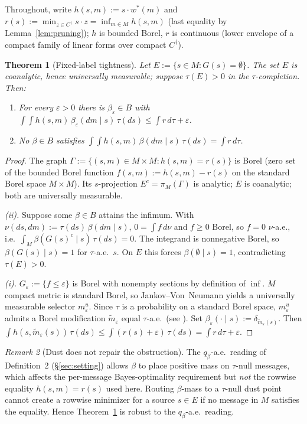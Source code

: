 \documentclass[11pt]{article}
\newtheorem{theorem}{Theorem}
\theoremstyle{definition}
\theoremstyle{remark}
\newtheorem{remark}[theorem]{Remark}
\newcommand{\eps}{\varepsilon}
\begin{document}
Throughout, write $h(s,m) := s\cdot w^*(m)$ and
$r(s) := \min_{z\in C^\dagger} s\cdot z = \inf_{m\in M} h(s,m)$ (last
equality by Lemma~\ref{lem:pruning}); $h$ is bounded Borel, $r$ is
continuous (lower envelope of a compact family of linear forms over
compact $C^\dagger$).

\begin{theorem}[Fixed-label tightness]\label{thm:tightness}
Let $E := \{s\in M : G(s) = \emptyset\}$. The set $E$ is coanalytic,
hence universally measurable; suppose $\tau(E)>0$ in the
$\tau$-completion. Then:
\begin{enumerate}[leftmargin=2em,label=(\roman*)]
\item For every $\eps>0$ there is $\beta_\eps\in B$ with
$\int\!\int h(s,m)\,\beta_\eps(dm\mid s)\,\tau(ds) \le \int r\,d\tau + \eps$.
\item No $\beta\in B$ satisfies
$\int\!\int h(s,m)\,\beta(dm\mid s)\,\tau(ds) = \int r\,d\tau$.
\end{enumerate}
\end{theorem}

\begin{proof}
The graph
$\Gamma := \{(s,m)\in M\times M : h(s,m) = r(s)\}$ is Borel (zero
set of the bounded Borel function $f(s,m) := h(s,m) - r(s)$ on the
standard Borel space $M\times M$). Its $s$-projection
$E^c = \pi_M(\Gamma)$ is analytic; $E$ is coanalytic; both are
universally measurable.

\emph{(ii).} Suppose some $\beta\in B$ attains the infimum. With
$\nu(ds,dm) := \tau(ds)\,\beta(dm\mid s)$,
$0 = \int f\,d\nu$ and $f\ge 0$ Borel, so $f = 0$ $\nu$-a.e., i.e.\
$\int_M \beta(G(s)^c\mid s)\,\tau(ds) = 0$. The integrand is
nonnegative Borel, so $\beta(G(s)\mid s) = 1$ for $\tau$-a.e.\ $s$.
On $E$ this forces $\beta(\emptyset\mid s) = 1$, contradicting
$\tau(E) > 0$.

\emph{(i).} $G_\eps := \{f\le\eps\}$ is Borel with nonempty
sections by definition of $\inf$. $M$ compact metric is standard
Borel, so Jankov--Von~Neumann
\cite[Thm.~18.13]{AliprantisBorder2006} yields a universally
measurable selector $m_\eps^u$. Since $\tau$ is a probability on a
standard Borel space, $m_\eps^u$ admits a Borel modification
$\tilde m_\eps$ equal $\tau$-a.e.\ (see \cite{Bogachev2007}). Set
$\beta_\eps(\cdot\mid s) := \delta_{\tilde m_\eps(s)}$.
Then $\int h(s,\tilde m_\eps(s))\,\tau(ds)\le \int(r(s)+\eps)\,\tau(ds)
= \int r\,d\tau + \eps$.
\end{proof}

\begin{remark}[Dust does not repair the obstruction]
The $q_\beta$-a.e.\ reading of Definition~2 (\S\ref{sec:setting})
allows $\beta$ to place positive mass on $\tau$-null messages, which
affects the per-message Bayes-optimality requirement but \emph{not}
the rowwise equality $h(s,m) = r(s)$ used here. Routing $\beta$-mass
to a $\tau$-null dust point cannot create a rowwise minimizer for a
source $s\in E$ if no message in $M$ satisfies the equality. Hence
Theorem~\ref{thm:tightness} is robust to the $q_\beta$-a.e.\ reading.
\end{remark}
\end{document}
